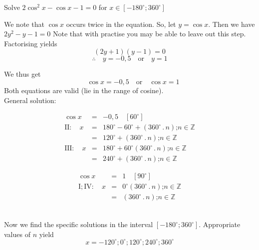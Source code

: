 \begin{wex}{}
{
Solve $2\cos^2x-\cos x - 1 = 0$ for $x\in [-180^\circ;360^\circ]$\\
}
{
We note that $\cos x$ occurs twice in the equation. So, let $y=\cos x$. Then we have $2y^2-y-1=0$
Note that with practise you may be able to leave out this step.\\

Factorising yields
\[(2y+1)(y-1)=0 \]
\[\therefore \quad y = -0,5 \quad \mbox{or} \quad y=1 \]

We thus get
\[ \quad \cos x = -0,5 \quad \mbox{or} \quad \cos x=1 \]
Both equations are valid (\ie lie in the range of cosine).\\
General solution:

\hspace*{-40pt}
\begin{minipage}{0.4\textwidth}
\begin{eqnarray*}
\cos x &=& -0,5 \quad [60^\circ]\\
\mathrm{II:} \quad x &=& 180^\circ - 60^\circ +(360^\circ\,.\, n) \mbox{;} n\in\mathbb{Z}\\
&=& 120^\circ +(360^\circ\,.\, n) \mbox{;} n\in\mathbb{Z}\\
\mathrm{III:} \quad x &=& 180^\circ + 60^\circ (360^\circ\,.\, n) \mbox{;} n\in\mathbb{Z}\\
&=& 240^\circ +(360^\circ\,.\, n) \mbox{;} n\in\mathbb{Z}
\end{eqnarray*}
\end{minipage}
\hspace*{20pt}
\begin{minipage}{0.4\textwidth}
\begin{eqnarray*}
\cos x &=& 1 \quad [90^\circ] \\
\mathrm{I; IV:} \quad x &=& 0^\circ  (360^\circ\,.\, n) \mbox{;} n\in\mathbb{Z}\\
&=& (360^\circ\,.\, n) \mbox{;} n\in\mathbb{Z}
\end{eqnarray*}
\end{minipage}\\

Now we find the specific solutions in the interval $[-180^\circ;360^\circ]$. Appropriate values of $n$ yield
\[x= -120^\circ; 0^\circ; 120^\circ; 240^\circ; 360^\circ \]
}
\end{wex}

